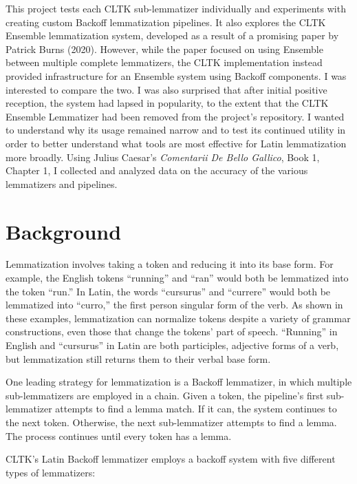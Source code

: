 \documentclass[11pt]{article}
\begin{document}
This project tests each CLTK sub-lemmatizer individually and experiments with creating custom Backoff lemmatization pipelines. It also explores the CLTK Ensemble lemmatization system, developed as a result of a promising paper by Patrick Burns (2020)\cite{ensemble}. However, while the paper focused on using Ensemble between multiple complete lemmatizers, the CLTK implementation instead provided infrastructure for an Ensemble system using Backoff components. I was interested to compare the two. I was also surprised that after initial positive reception, the system had lapsed in popularity, to the extent that the CLTK Ensemble Lemmatizer had been removed from the project’s repository. I wanted to understand why its usage remained narrow and to test its continued utility in order to better understand what tools are most effective for Latin lemmatization more broadly. Using Julius Caesar's \textit{Comentarii De Bello Gallico}, Book 1, Chapter 1, I collected and analyzed data on the accuracy of the various lemmatizers and pipelines.


\section{Background}

Lemmatization involves taking a token and reducing it into its base form. For example, the  English tokens “running” and “ran” would both be lemmatized into the token “run.” In Latin, the words “cursurus” and “currere” would both be lemmatized into “curro,” the first person singular form of the verb. As shown in these examples, lemmatization can normalize tokens despite a variety of grammar constructions, even those that change the tokens’ part of speech. “Running” in English and “cursurus” in Latin are both participles, adjective forms of a verb, but lemmatization still returns them to their verbal base form.

One leading strategy for lemmatization is a Backoff lemmatizer, in which multiple sub-lemmatizers are employed in a chain. Given a token, the pipeline's first sub-lemmatizer attempts to find a lemma match. If it can, the system continues to the next token. Otherwise, the next sub-lemmatizer attempts to find a lemma. The process continues until every token has a lemma.

CLTK's Latin Backoff lemmatizer employs a backoff system with five different types of lemmatizers: 
\end{document}
